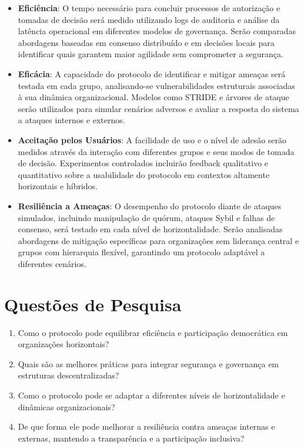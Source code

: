 \begin{itemize}

    \item \textbf{Eficiência}: O tempo necessário para concluir processos de autorização e
tomadas de decisão será medido utilizando logs de auditoria e análise da
latência operacional em diferentes modelos de governança. Serão comparadas
abordagens baseadas em consenso distribuído e em decisões locais para
identificar quais garantem maior agilidade sem comprometer a segurança.

    \item \textbf{Eficácia}: A capacidade do protocolo de identificar e mitigar ameaças
será testada em cada grupo, analisando-se vulnerabilidades estruturais
associadas à sua dinâmica organizacional. Modelos como STRIDE e árvores de
ataque serão utilizados para simular cenários adversos e avaliar a resposta do
sistema a ataques internos e externos.

    \item \textbf{Aceitação pelos Usuários}: A facilidade de uso e o nível de adesão serão
medidos através da interação com diferentes grupos e seus modos de tomada de
decisão. Experimentos controlados incluirão feedback qualitativo e quantitativo
sobre a usabilidade do protocolo em contextos altamente horizontais e híbridos.

    \item \textbf{Resiliência a Ameaças}: O desempenho do protocolo diante de ataques
simulados, incluindo manipulação de quórum, ataques Sybil e falhas de consenso,
será testado em cada nível de horizontalidade. Serão analisadas abordagens de
mitigação específicas para organizações sem liderança central e grupos com
hierarquia flexível, garantindo um protocolo adaptável a diferentes cenários.

\end{itemize}

\section{Questões de Pesquisa}
\label{sec:research_questions}

\begin{enumerate}
    \item Como o protocolo pode equilibrar eficiência e participação
democrática em organizações horizontais?
    \item Quais são as melhores práticas para integrar segurança e
governança em estruturas descentralizadas?
    \item Como o protocolo pode se adaptar a diferentes níveis de
horizontalidade e dinâmicas organizacionais?
    \item De que forma ele pode melhorar a resiliência contra ameaças
internas e externas, mantendo a transparência e a participação
inclusiva?
\end{enumerate}

